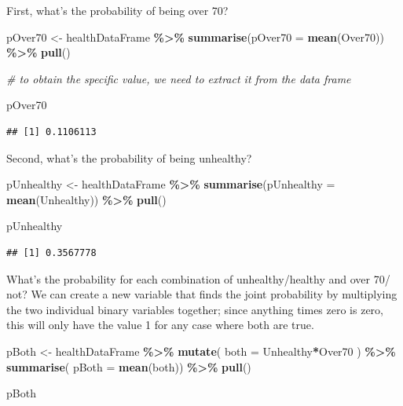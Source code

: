 \documentclass[
  12pt,
]{book}
\newenvironment{Shaded}{\begin{snugshade}}{\end{snugshade}}
\newcommand{\AttributeTok}[1]{\textcolor[rgb]{0.13,0.29,0.53}{#1}}
\newcommand{\CommentTok}[1]{\textcolor[rgb]{0.56,0.35,0.01}{\textit{#1}}}
\newcommand{\FunctionTok}[1]{\textcolor[rgb]{0.13,0.29,0.53}{\textbf{#1}}}
\newcommand{\NormalTok}[1]{#1}
\newcommand{\OtherTok}[1]{\textcolor[rgb]{0.56,0.35,0.01}{#1}}
\newcommand{\SpecialCharTok}[1]{\textcolor[rgb]{0.81,0.36,0.00}{\textbf{#1}}}
\begin{document}
First, what's the probability of being over 70?

\begin{Shaded}
\begin{Highlighting}[]
\NormalTok{pOver70 }\OtherTok{\textless{}{-}} 
\NormalTok{  healthDataFrame }\SpecialCharTok{\%\textgreater{}\%}
  \FunctionTok{summarise}\NormalTok{(}\AttributeTok{pOver70 =} \FunctionTok{mean}\NormalTok{(Over70)) }\SpecialCharTok{\%\textgreater{}\%} 
  \FunctionTok{pull}\NormalTok{()}

\CommentTok{\# to obtain the specific value, we need to extract it from the data frame}

\NormalTok{pOver70}
\end{Highlighting}
\end{Shaded}

\begin{verbatim}
## [1] 0.1106113
\end{verbatim}

Second, what's the probability of being unhealthy?

\begin{Shaded}
\begin{Highlighting}[]
\NormalTok{pUnhealthy }\OtherTok{\textless{}{-}} 
\NormalTok{  healthDataFrame }\SpecialCharTok{\%\textgreater{}\%}
  \FunctionTok{summarise}\NormalTok{(}\AttributeTok{pUnhealthy =} \FunctionTok{mean}\NormalTok{(Unhealthy)) }\SpecialCharTok{\%\textgreater{}\%} 
  \FunctionTok{pull}\NormalTok{()}

\NormalTok{pUnhealthy}
\end{Highlighting}
\end{Shaded}

\begin{verbatim}
## [1] 0.3567778
\end{verbatim}

What's the probability for each combination of unhealthy/healthy and over 70/ not? We can create a new variable that finds the joint probability by multiplying the two individual binary variables together; since anything times zero is zero, this will only have the value 1 for any case where both are true.

\begin{Shaded}
\begin{Highlighting}[]
\NormalTok{pBoth }\OtherTok{\textless{}{-}}\NormalTok{ healthDataFrame }\SpecialCharTok{\%\textgreater{}\%} 
  \FunctionTok{mutate}\NormalTok{(}
    \AttributeTok{both =}\NormalTok{ Unhealthy}\SpecialCharTok{*}\NormalTok{Over70}
\NormalTok{  ) }\SpecialCharTok{\%\textgreater{}\%}
  \FunctionTok{summarise}\NormalTok{(}
    \AttributeTok{pBoth =} \FunctionTok{mean}\NormalTok{(both)) }\SpecialCharTok{\%\textgreater{}\%} 
  \FunctionTok{pull}\NormalTok{()}

\NormalTok{pBoth}
\end{Highlighting}
\end{Shaded}
\end{document}
